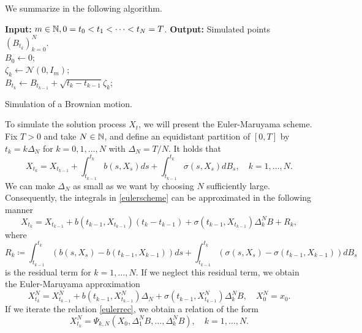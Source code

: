 We summarize in the following algorithm.
\begin{algorithm}[H] 
\SetAlgoLined
    \textbf{Input:} $m\in\mathbb{N}, 0=t_{0}<t_{1}<\dots <t_{N}=T$.\newline
    \textbf{Output:} Simulated points $(B_{t_{k}})_{k=0}^{N}$.\\
    $B_{0}\gets 0$; \\
    {$\zeta_{k} \gets \mathcal{N}(0,I_{m})$;\\
    $B_{t_{k}}\gets B_{t_{k-1}} + \sqrt{t_{k}-t_{k-1}}\zeta_{k}$;}
\caption{Simulation of a Brownian motion.}
\label{alg:euler}
\end{algorithm}
To simulate the solution process $X_{t}$, we will present the Euler-Maruyama scheme. Fix $T>0$ and take $N\in \mathbb{N}$, and define an equidistant partition of $[0,T]$ by $t_{k}=k\Delta_{N}$ for $k=0,1,\dots,N$ with $\Delta_{N}=T/N$. It holds that
\begin{equation}\label{eulerscheme}
    X_{t_{k}}=X_{t_{k-1}} + \int_{t_{k-1}}^{t_{k}}b(s,X_{s})ds + \int_{t_{k-1}}^{t_{k}}\sigma(s,X_{s})dB_{s}, \quad k=1,\dots,N.
\end{equation}
We can make $\Delta_{N}$ as small as we want by choosing $N$ sufficiently large. Consequently, the integrals in \eqref{eulerscheme} can be approximated in the following manner
\begin{equation}
    X_{t_{k}}=X_{t_{k-1}} + b(t_{k-1},X_{t_{k-1}})(t_{k}-t_{k-1}) + \sigma(t_{k-1},X_{t_{k-1}})\Delta_{k}^{N}B + R_{k},
\end{equation}
where
\begin{equation}
    R_{k}\coloneqq \int_{t_{k-1}}^{t_{k}}\left(b(s,X_{s}) - b(t_{k-1},X_{k-1})\right)ds  + \int_{t_{k-1}}^{t_{k}}\left(\sigma(s,X_{s}) - \sigma(t_{k-1},X_{k-1})\right)dB_{s}
\end{equation}
is the residual term for $k=1,\dots, N$. If we neglect this residual term, we obtain the Euler-Maruyama approximation
\begin{equation}\label{eulerrec}
    X_{t_{k}}^{N}=X_{t_{k-1}}^{N} + b(t_{k-1},X_{t_{k-1}}^{N})\Delta_{N} + \sigma(t_{k-1},X_{t_{k-1}}^{N})\Delta_{k}^{N}B,\quad X_{0}^{N}=x_{0}.
\end{equation}
If we iterate the relation \eqref{eulerrec}, we obtain a relation of the form
\begin{equation}
    X_{t_{k}}^{N}=\Psi_{k,N}(X_{0},\Delta_{1}^{N}B,\dots,\Delta_{k}^{N}B), \quad k=1,\dots,N.
\end{equation}

